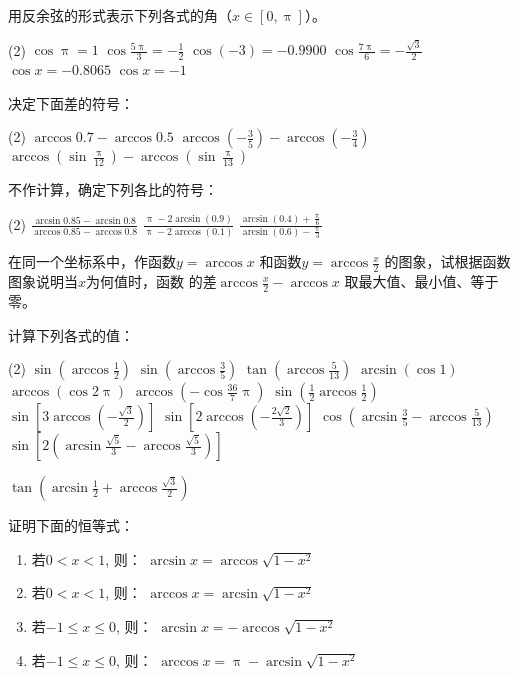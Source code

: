 \begin{Exercise}
\begin{question}
    \item 用反余弦的形式表示下列各式的角（$x\in[0,\uppi]$）。
\begin{tasks}(2)
    \task $\cos\uppi =1$
    \task $\cos\frac{5\uppi}{3}=-\frac{1}{2}$
    \task $\cos(-3)=-0.9900$
    \task $\cos\frac{7\uppi}{6}=-\frac{\sqrt{3}}{2}$
    \task $\cos x=-0.8065$
    \task $\cos x=-1$
\end{tasks}

\item 决定下面差的符号：
\begin{tasks}(2)
  \task $\arccos0.7-\arccos0.5$
  \task $\arccos\left(-\frac{3}{5}\right)-\arccos\left(-\frac{3}{4}\right)$
  \task $\arccos\left(\sin\frac{\uppi}{12}\right)-\arccos\left(\sin\frac{\uppi}{13}\right)$
\end{tasks}
\item 不作计算，确定下列各比的符号：
\begin{tasks}(2)
    \task $\frac{\arcsin0.85-\arcsin0.8}{\arccos0.85-\arccos0.8}$
    \task $\frac{\uppi -2\arcsin(0.9)}{\uppi -2\arccos(0.1)}$
    \task $\frac{\arcsin(0.4)+\frac{\uppi}{6}}{\arcsin(0.6)-\frac{\uppi}{3}}$
\end{tasks}

\item 在同一个坐标系中，作函数$y=\arccos x$
和函数$y=\arccos\frac{x}{2}$
的图象，试根据函数图象说明当$x$为何值时，函数
的差$\arccos\frac{x}{2}-\arccos x$
取最大值、最小值、等于零。
\item 计算下列各式的值：
    \begin{tasks}(2)
\task $\sin \left(\arccos \frac{1}{2}\right)$
\task $\sin \left(\arccos \frac{3}{5}\right)$
\task $\tan \left(\arccos \frac{5}{13}\right)$
\task $\arcsin (\cos 1)$
\task $\arccos (\cos 2 \uppi)$
\task $\arccos \left(-\cos \frac{36}{7} \uppi\right)$
\task $\sin \left(\frac{1}{2} \arccos \frac{1}{2}\right)$
\task $\sin \left[3 \arccos \left(-\frac{\sqrt{3}}{2}\right)\right]$
\task $\sin \left[2 \arccos \left(-\frac{2 \sqrt{2}}{3}\right)\right]$
\task $\cos \left(\arcsin \frac{3}{5}-\arccos \frac{5}{13}\right)$    
\task $\sin\left[2\left(\arcsin\frac{\sqrt{5}}{3}-\arccos\frac{\sqrt{5}}{3}\right)\right]$
    \item $\tan\left(\arcsin\frac{1}{2}+\arccos\frac{\sqrt{3}}{2}\right)$
    \end{tasks}

\item 证明下面的恒等式：
\begin{enumerate}
\item 若$0<x<1$, 则：
$\arcsin x=\arccos\sqrt{1-x^2}$
\item 若$0<x<1$, 则：
$\arccos x=\arcsin\sqrt{1-x^2}$
\item 若$-1\leqslant x\leqslant 0$, 则：
$\arcsin x=-\arccos\sqrt{1-x^2}$
\item 若$-1\leqslant x\leqslant 0$, 则：
$\arccos x=\uppi-\arcsin\sqrt{1-x^2}$
\end{enumerate}


\end{question}
\end{Exercise}
